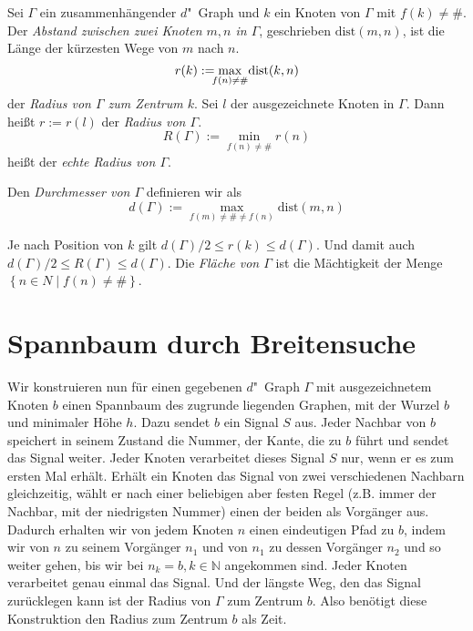 \documentclass[11pt]{article}
\newcommand{\defWord}[1]{\emph{#1}}
\begin{document}
\begin{definition}
	Sei $\Gamma$ ein zusammenhängender $d$"~Graph und $k$ ein Knoten von $\Gamma$ mit $f(k) \neq \#$.
	Der \defWord{Abstand zwischen zwei Knoten $m, n$ in $\Gamma$}, geschrieben $\text{dist}(m , n)$, ist die Länge der kürzesten Wege von $m$ nach $n$.
	\begin{displaymath}
	r(k) := \max_{\mathclap{f(n) \neq \#}} \text{ dist}(k, n)
	\end{displaymath}
	der \defWord{Radius von $\Gamma$ zum Zentrum $k$}.
	Sei $l$ der ausgezeichnete Knoten in $\Gamma$.
	Dann heißt $r := r(l)$ der \defWord{Radius von $\Gamma$}.
	\begin{displaymath}
		R(\Gamma) := \min_{f(n) \neq \#} r(n)
	\end{displaymath}
	 heißt der \defWord{echte Radius von $\Gamma$}.
	
	Den \defWord{Durchmesser von $\Gamma$} definieren wir als 
	\begin{displaymath}
		d(\Gamma) := \max_{f(m) \neq \# \neq f(n)} \text{dist}(m, n)
	\end{displaymath} 
	
	Je nach Position von $k$ gilt $d(\Gamma)/2 \le r\left(k\right) \le d(\Gamma).$ Und damit auch $d(\Gamma)/2 \le R(\Gamma) \le d(\Gamma)$.
	Die \defWord{Fläche von $\Gamma$} ist die Mächtigkeit der Menge $ \left\{n \in N \mid f(n) \neq \# \right\}$.
	
\end{definition}

\section{Spannbaum durch Breitensuche}
Wir konstruieren nun für einen gegebenen $d$"~Graph $\Gamma$ mit ausgezeichnetem Knoten $b$ einen Spannbaum des zugrunde liegenden Graphen, mit der Wurzel $b$ und minimaler Höhe $h$. 
Dazu sendet $b$ ein Signal $S$ aus. Jeder Nachbar von $b$ speichert in seinem Zustand die Nummer, der Kante, die zu $b$ führt und sendet das Signal weiter. 
Jeder Knoten verarbeitet dieses Signal $S$ nur, wenn er es zum ersten Mal erhält. 
Erhält ein Knoten das Signal von zwei verschiedenen Nachbarn gleichzeitig, wählt er nach einer beliebigen aber festen Regel (z.B. immer der Nachbar, mit der niedrigsten Nummer) einen der beiden als Vorgänger aus. 
Dadurch erhalten wir von jedem Knoten $n$ einen eindeutigen Pfad zu $b$, indem wir von $n$ zu seinem Vorgänger $n_1$ und von $n_1$ zu dessen Vorgänger $n_2$ und so weiter gehen, bis wir bei $n_k=b, k \in \mathbb{N}$ angekommen sind. 
Jeder Knoten verarbeitet genau einmal das Signal. 
Und der längste Weg, den das Signal zurücklegen kann ist der Radius von $\Gamma$ zum Zentrum $b$. 
Also benötigt diese Konstruktion den Radius zum Zentrum $b$ als Zeit.
\end{document}
